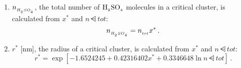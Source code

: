 \begin{enumerate}
  \item $n_{_{H_{_2}SO_{_4}}}$, the total number of $\rm H_{_2}SO_{_4}$ molecules in a critical
        cluster, is calculated from $x^*$ and $n\dsub{tot}$:
        \begin{equation}
          n_{_{H_{_2}SO_{_4}}} = n_{_{tot}} x^* \,.
        \end{equation}
  \item $r^*$ [nm], the radius of a critical cluster, is calculated from
        $x^*$ and $n\dsub{tot}$:
        \begin{equation}
          r^* = \exp \left[ -1.6524245 + 0.42316402 x^* +
                0.3346648 \ln n\dsub{tot} \right] \,.
        \end{equation}
\end{enumerate}

